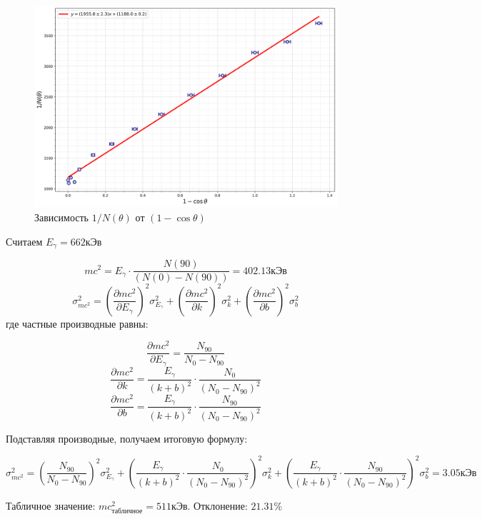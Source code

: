 \documentclass[a4paper,12pt]{article}
\begin{document}
\begin{enumerate}
    \begin{figure}[h]
    \centering
    \includegraphics[width=1\linewidth]{1.png}
    \caption{Зависимость $1/N(\theta)$ от $(1-\cos{\theta})$}
    \label{graph1}
    \end{figure}
    
    Считаем $E_\gamma=662$кЭв
    
    $$
    mc^2 = E_\gamma \cdot \frac{N(90)}{(N(0) - N(90))}=402.13 \texttt{кЭв}
    $$
    $$
    \sigma_{mc^2}^2 = \left(\frac{\partial mc^2}{\partial E_\gamma}\right)^2 \sigma_{E_\gamma}^2 + \left(\frac{\partial mc^2}{\partial k}\right)^2 \sigma_k^2 + \left(\frac{\partial mc^2}{\partial b}\right)^2 \sigma_b^2
    $$
    где частные производные равны:
    
    $$
    \frac{\partial mc^2}{\partial E_\gamma} = \frac{N_{90}}{N_0 - N_{90}}
    $$
    $$
    \frac{\partial mc^2}{\partial k} = \frac{E_\gamma}{(k + b)^2} \cdot \frac{N_0}{(N_0 - N_{90})^2} 
    $$
    $$
    \frac{\partial mc^2}{\partial b} = \frac{E_\gamma}{(k + b)^2} \cdot \frac{N_{90}}{(N_0 - N_{90})^2}
    $$
    
    Подставляя производные, получаем итоговую формулу:
    
    $$
    \sigma_{mc^2}^2 = \left(\frac{N_{90}}{N_0 - N_{90}}\right)^2 \sigma_{E_\gamma}^2 + \left(\frac{E_\gamma}{(k + b)^2} \cdot \frac{N_0}{(N_0 - N_{90})^2}\right)^2 \sigma_k^2 + \left(\frac{E_\gamma}{(k + b)^2} \cdot \frac{N_{90}}{(N_0 - N_{90})^2}\right)^2 \sigma_b^2=3.05\texttt{кЭв}
    $$

    Табличное значение: $mc^2_\text{табличное}=511$кЭв. Отклонение: $21.31\%$

    \begin{center}
    \end{center}

\end{enumerate}
\end{document}
